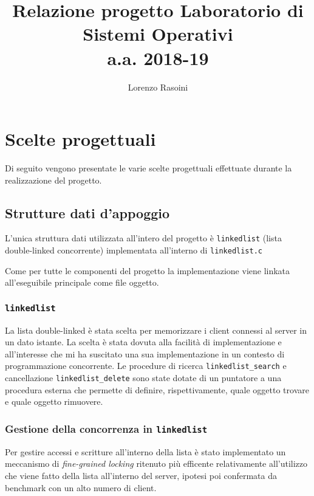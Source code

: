 \documentclass[a4paper,11pt]{article}
\begin{document}
\begin{titlepage}

\title{{Relazione progetto Laboratorio di\\Sistemi Operativi\\a.a. 2018-19}}
\author{Lorenzo Rasoini}
\date{}
\maketitle

\thispagestyle{empty}
\tableofcontents
\end{titlepage}

\newpage

\section{Scelte progettuali}
Di seguito vengono presentate le varie scelte progettuali effettuate durante la realizzazione del progetto.
\subsection{Strutture dati d'appoggio}
L'unica struttura dati utilizzata all'intero del progetto è \texttt{linkedlist} (lista double-linked concorrente) implementata all'interno
di \texttt{linkedlist.c}

Come per tutte le componenti del progetto la implementazione viene linkata all'eseguibile principale come file oggetto.

\subsubsection{\texttt{linkedlist}}
La lista double-linked è stata scelta per memorizzare i client connessi al server in un dato istante.
La scelta è stata dovuta alla facilità di implementazione e all'interesse che mi ha suscitato una sua implementazione in un contesto di programmazione concorrente.
Le procedure di ricerca \texttt{linkedlist\_search} e cancellazione \texttt{linkedlist\_delete} sono state dotate di un puntatore
 a una procedura esterna che permette di definire, rispettivamente, quale oggetto trovare e quale oggetto rimuovere.


\subsubsection{Gestione della concorrenza in \texttt{linkedlist}}
Per gestire accessi e scritture all'interno della lista è stato implementato un meccanismo di \emph{fine-grained locking} ritenuto più efficente relativamente
all'utilizzo che viene fatto della lista all'interno del server, ipotesi poi confermata da benchmark con un alto numero di client.
\end{document}
